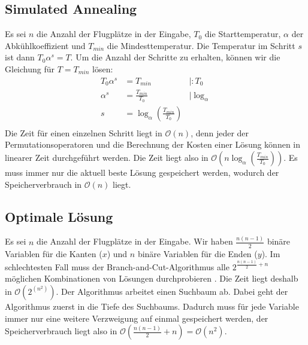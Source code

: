 \documentclass[a4paper,10pt,ngerman]{scrartcl}
\begin{document}
\subsection{Simulated Annealing}
Es sei $n$ die Anzahl der Flugplätze in der Eingabe, $T_0$ die Starttemperatur,
$\alpha$ der Abkühlkoeffizient und $T_{min}$ die Mindesttemperatur. Die
Temperatur im Schritt $s$ ist dann $T_0\alpha^s=T$. Um die Anzahl der Schritte
zu erhalten, können wir die Gleichung für $T=T_{min}$ lösen:
\begin{align*}
  T_0\alpha^s & = T_{min}                            & |:T_0          \\
  \alpha^s    & = \frac{T_{min}}{T_0}                & |\log_{\alpha} \\
  s           & = \log_{\alpha}(\frac{T_{min}}{T_0})                  \\
\end{align*}
Die Zeit für einen einzelnen Schritt liegt in $\mathcal{O}(n)$, denn jeder der Permutationsoperatoren
und die Berechnung der Kosten einer Lösung können in linearer Zeit durchgeführt werden. Die Zeit liegt also in
$\mathcal{O}(n\log_{\alpha}(\frac{T_{min}}{T_0}))$. Es muss immer nur die aktuell beste Lösung gespeichert werden,
wodurch der Speicherverbrauch in $\mathcal{O}(n)$ liegt.
\subsection{Optimale Lösung}
Es sei $n$ die Anzahl der Flugplätze in der Eingabe. Wir haben
$\frac{n(n-1)}{2}$ binäre Variablen für die Kanten ($x$) und $n$ binäre
Variablen für die Enden ($y$). Im schlechtesten Fall muss der
Branch-and-Cut-Algorithmus alle $2^{\frac{n(n-1)}{2}+n}$ möglichen
Kombinationen von Lösungen durchprobieren \cite[653]{korte_2018}. Die Zeit
liegt deshalb in $\mathcal{O}(2^(n^2))$. Der Algorithmus arbeitet einen
Suchbaum ab. Dabei geht der Algorithmus zuerst in die Tiefe des Suchbaums.
Dadurch muss für jede Variable immer nur eine weitere Verzweigung auf einmal
gespeichert werden, der Speicherverbrauch liegt also in
$\mathcal{O}(\frac{n(n-1)}{2}+n) = \mathcal{O}(n^2)$.
\end{document}
